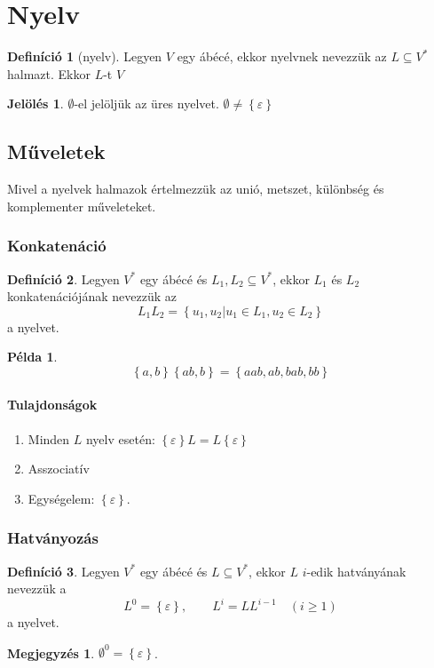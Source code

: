 \documentclass[a4paper,12pt]{article}
\theoremstyle{definition}
\newtheorem*{definition*}{Definíció}
\newtheorem*{remark}{Megjegyzés}
\newtheorem*{example}{Példa}
\newtheorem*{notation*}{Jelölés}
\begin{document}
	\section{Nyelv}
	\begin{definition*}[nyelv]
		Legyen $V$ egy ábécé, ekkor nyelvnek nevezzük az $ L \subseteq V^* $ halmazt. Ekkor $L$-t $V$
	\end{definition*}

	\begin{notation*}
		$ \emptyset $-el jelöljük az üres nyelvet. $\emptyset \ne \left\lbrace \varepsilon \right\rbrace $ 
	\end{notation*}

	\subsection{Műveletek}
	\noindent
	Mivel a nyelvek halmazok értelmezzük az unió, metszet, különbség és komplementer műveleteket. 
	\subsubsection{Konkatenáció}
	
	\begin{definition*}
		Legyen $V^*$ egy ábécé és $L_1, L_2 \subseteq V^*$, ekkor $L_1$ és $L_2$ konkatenációjának nevezzük az 
		\[
			L_1L_2 = \left\lbrace u_1,u_2 | u_1 \in L_1, u_2 \in L_2 \right\rbrace 
		\]
		a nyelvet.
	\end{definition*}
	\begin{example}
		\[
			\left\lbrace a,b \right\rbrace \left\lbrace ab,b \right\rbrace = \left\lbrace aab, ab, bab, bb \right\rbrace   
		\]
	\end{example}
	\paragraph{Tulajdonságok}
	\begin{enumerate}
		\item Minden $ L $ nyelv esetén: $ \left\lbrace \varepsilon \right\rbrace L = L \left\lbrace \varepsilon \right\rbrace $
		\item Asszociatív
		\item Egységelem: $ \left\lbrace \varepsilon \right\rbrace $.
	\end{enumerate}

	\subsubsection{Hatványozás}
	\begin{definition*}
		Legyen $V^*$ egy ábécé és $L \subseteq V^* $, ekkor $L$ $i$-edik hatványának nevezzük a
		\[
		L^0 = \left\lbrace \varepsilon \right\rbrace, \qquad L^i = LL^{i-1} \quad (i \ge 1)
		\]
		a nyelvet.
	\end{definition*}
	\begin{remark}
		$ \emptyset^0 = \left\lbrace \varepsilon \right\rbrace $. 
	\end{remark}
\end{document}
